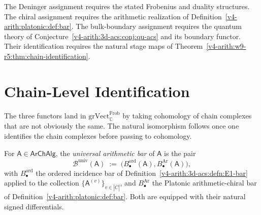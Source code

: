 \begin{remark}
\label{v4-arith:w9-r5:rem:three-functors-disjoint}
The Deninger assignment requires the stated Frobenius and duality
structures. The chiral assignment requires the arithmetic realization
of Definition~\ref{v4-arith:platonic:def:bar}. The bulk-boundary assignment
requires the quantum theory of Conjecture~\ref{v4-arith:3d-acs:conj:qu-acs}
and its boundary functor. Their identification requires the natural
stage maps of Theorem~\ref{v4-arith:w9-r5:thm:chain-identification}.
\end{remark}

\section{Chain-Level Identification}
\label{v4-arith:w9-r5:chain-level}

The three functors land in \(\mathrm{grVect}_{\mathbb{C}}^{\mathrm{Frob}}\)
by taking cohomology of chain complexes that are not obviously the same.
The natural isomorphism follows once one identifies the chain complexes
before passing to cohomology.

\begin{definition}
\label{v4-arith:w9-r5:def:universal-bar}
For \(\mathsf{A}\in\mathsf{ArChAlg}\), the
\emph{universal arithmetic bar} of \(\mathsf{A}\) is the pair
\begin{equation}
\label{v4-arith:w9-r5:eq:universal-bar}
\mathcal{B}^{\mathrm{univ}}(\mathsf{A})
\;:=\;\bigl(B^{\mathrm{ord}}_{\bullet}(\mathsf{A}),
B^{\mathrm{Ar}}_{\bullet}(\mathsf{A})\bigr),
\end{equation}
with \(B^{\mathrm{ord}}_{\bullet}\) the ordered incidence bar of
Definition~\ref{v4-arith:3d-acs:defn:E1-bar} applied to the collection
\(\{\mathsf{A}^{(v)}\}_{v\in|\overline{C}|}\), and \(B^{\mathrm{Ar}}_{\bullet}\)
the Platonic arithmetic-chiral bar of
Definition~\ref{v4-arith:platonic:def:bar}. Both are equipped with their
natural signed differentials.
\end{definition}

